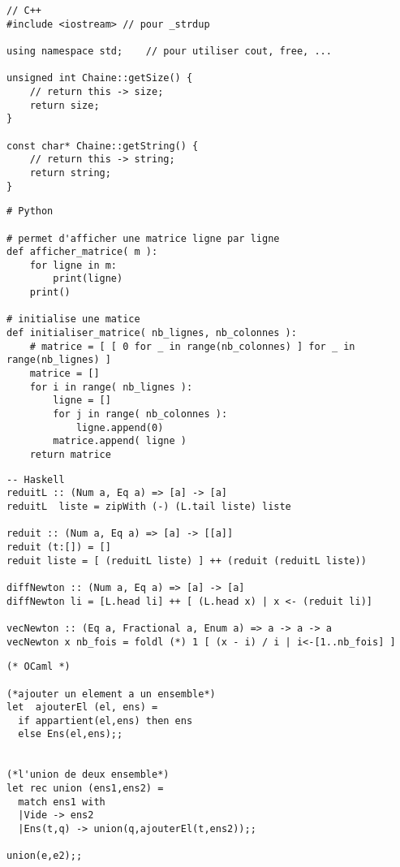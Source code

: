 \begin{verbatim}
// C++
#include <iostream> // pour _strdup

using namespace std;	// pour utiliser cout, free, ...

unsigned int Chaine::getSize() {
	// return this -> size;
	return size;
}

const char* Chaine::getString() {
	// return this -> string;
	return string;
}
\end{verbatim}


\begin{verbatim}
# Python 

# permet d'afficher une matrice ligne par ligne
def afficher_matrice( m ):
    for ligne in m:
        print(ligne)
    print()

# initialise une matice
def initialiser_matrice( nb_lignes, nb_colonnes ):
    # matrice = [ [ 0 for _ in range(nb_colonnes) ] for _ in range(nb_lignes) ]
    matrice = []
    for i in range( nb_lignes ):
        ligne = []
        for j in range( nb_colonnes ):
            ligne.append(0)
        matrice.append( ligne )
    return matrice
\end{verbatim}




\begin{verbatim}
-- Haskell
reduitL :: (Num a, Eq a) => [a] -> [a]
reduitL  liste = zipWith (-) (L.tail liste) liste
			
reduit :: (Num a, Eq a) => [a] -> [[a]]
reduit (t:[]) = []								
reduit liste = [ (reduitL liste) ] ++ (reduit (reduitL liste))

diffNewton :: (Num a, Eq a) => [a] -> [a]
diffNewton li = [L.head li] ++ [ (L.head x) | x <- (reduit li)]

vecNewton :: (Eq a, Fractional a, Enum a) => a -> a -> a
vecNewton x nb_fois = foldl (*) 1 [ (x - i) / i | i<-[1..nb_fois] ]
\end{verbatim}



\begin{verbatim}
(* OCaml *)

(*ajouter un element a un ensemble*)
let  ajouterEl (el, ens) =
  if appartient(el,ens) then ens
  else Ens(el,ens);;


(*l'union de deux ensemble*)
let rec union (ens1,ens2) =
  match ens1 with
  |Vide -> ens2
  |Ens(t,q) -> union(q,ajouterEl(t,ens2));;

union(e,e2);;
\end{verbatim}


